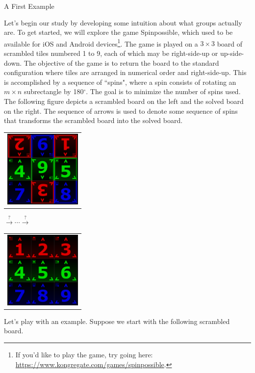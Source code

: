 \begin{section}{A First Example}\label{sec:first_example}


Let's begin our study by developing some intuition about what groups actually are.  To get started, we will explore the game Spinpossible\texttrademark, which used to be available for iOS and Android devices\footnote{If you'd like to play the game, try going here: \url{https://www.kongregate.com/games/spinpossible}.}.  The game is played on a $3\times 3$ board of scrambled tiles numbered 1 to 9, each of which may be right-side-up or up-side-down. The objective of the game is to return the board to the standard configuration where tiles are arranged in numerical order and right-side-up. This is accomplished by a sequence of ``spins", where a spin consists of rotating an $m\times n$ subrectangle by 180$^\circ$. The goal is to minimize the number of spins used.  The following figure depicts a scrambled board on the left and the solved board on the right.  The sequence of arrows is used to denote some sequence of spins that transforms the scrambled board into the solved board.

\begin{center}
\begin{tabular}{c}\includegraphics[width=1.5in]{scramble1.PNG}\end{tabular}
{\large $\xrightarrow{?} \cdots \xrightarrow{?}$}
\begin{tabular}{c}\includegraphics[width=1.5in]{scramble4.PNG}\end{tabular}
\end{center}

Let's play with an example.  Suppose we start with the following scrambled board.


\end{section}
